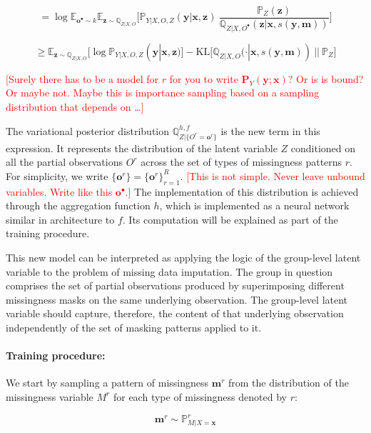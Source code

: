 \documentclass[a4paper,12pt,twoside,openright]{article}
\newcommand{\crit}[1]{\textcolor{red}{#1}}
\begin{document}
\[
    = \log \mathbb{E}_{\mathbf{o}^\bullet \sim k} \mathbb{E}_{\mathbf{z} \sim \mathbb{Q}_{Z | X, O}} \Biggl[ \mathbb{P}_{Y | X, O, Z} (\mathbf{y} | \mathbf{x}, \mathbf{z}) ~ \frac{\mathbb{P}_{Z} (\mathbf{z})}{\mathbb{Q}_{Z | X, O^{\bullet}} (\mathbf{z} | \mathbf{x}, s(\mathbf{y}, \mathbf{m}))} \Biggr]
\]

\[
    \geq \mathbb{E}_{\mathbf{z} \sim \mathbb{Q}_{Z | X, O}} \bigl[ \log \mathbb{P}_{Y | X, O, Z} (\mathbf{y} | \mathbf{x}, \mathbf{z}) \bigr] - \mathrm{KL} \bigl[ \mathbb{Q}_{Z | X, O} (\cdot | \mathbf{x}, s(\mathbf{y}, \mathbf{m})) ~||~ \mathbb{P}_{Z} \bigr]
\]

\crit{[Surely there has to be a model for $r$ for you to write $\mathbf{P}_Y (\mathbf{y} ; \mathbf{x})$? Or is is bound? Or maybe not. Maybe this is importance sampling based on a sampling distribution that depends on \dots]}

The variational posterior distribution $\mathbb{Q}^{h,f}_{Z | \{O^r = \mathbf{o}^r\}}$ is the new term in this expression. It represents the distribution of the latent variable $Z$ conditioned on all the partial observations $O^r$ across the set of types of missingness patterns $r$. For simplicity, we write $\{\mathbf{o}^r\} = \{\mathbf{o}^r\}_{r=1}^R$. \crit{[This is not simple. Never leave unbound variables. Write like this $\mathbf{o}^\bullet$.]} The implementation of this distribution is achieved through the aggregation function $h$, which is implemented as a neural network similar in architecture to $f$. Its computation will be explained as part of the training procedure.

This new model can be interpreted as applying the logic of the group-level latent variable to the problem of missing data imputation. The group in question comprises the set of partial observations produced by superimposing different missingness masks on the same underlying observation. The group-level latent variable should capture, therefore, the content of that underlying observation independently of the set of masking patterns applied to it.

\paragraph{Training procedure:} We start by sampling a pattern of missingness $\mathbf{m}^r$ from the distribution of the missingness variable $M^r$ for each type of missingness denoted by $r$:

\[
    \mathbf{m}^r \sim \mathbb{P}^r_{M | X = \mathbf{x}}
\]
\end{document}
